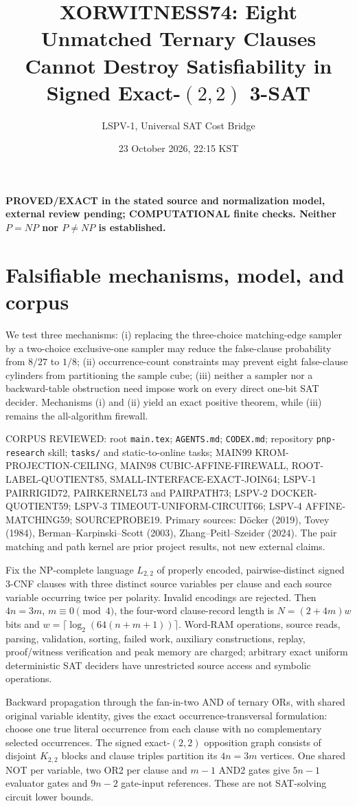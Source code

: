 \documentclass[11pt]{article}
\title{XORWITNESS74: Eight Unmatched Ternary Clauses Cannot Destroy Satisfiability in Signed Exact-$(2,2)$ 3-SAT}
\author{LSPV-1, Universal SAT Cost Bridge}
\date{23 October 2026, 22:15 KST}
\begin{document}
\maketitle
\begin{center}\textbf{PROVED/EXACT in the stated source and normalization model, external review pending; COMPUTATIONAL finite checks. Neither $P=NP$ nor $P\ne NP$ is established.}\end{center}
\section{Falsifiable mechanisms, model, and corpus}
We test three mechanisms: (i) replacing the three-choice matching-edge sampler by a two-choice exclusive-one sampler may reduce the false-clause probability from $8/27$ to $1/8$; (ii) occurrence-count constraints may prevent eight false-clause cylinders from partitioning the sample cube; (iii) neither a sampler nor a backward-table obstruction need impose work on every direct one-bit SAT decider. Mechanisms (i) and (ii) yield an exact positive theorem, while (iii) remains the all-algorithm firewall.

CORPUS REVIEWED: root \texttt{main.tex}; \texttt{AGENTS.md}; \texttt{CODEX.md}; repository \texttt{pnp-research} skill; \texttt{tasks/} and static-to-online tasks; MAIN99 KROM-PROJECTION-CEILING, MAIN98 CUBIC-AFFINE-FIREWALL, ROOT-LABEL-QUOTIENT85, SMALL-INTERFACE-EXACT-JOIN64; LSPV-1 PAIRRIGID72, PAIRKERNEL73 and PAIRPATH73; LSPV-2 DOCKER-QUOTIENT59; LSPV-3 TIMEOUT-UNIFORM-CIRCUIT66; LSPV-4 AFFINE-MATCHING59; SOURCEPROBE19. Primary sources: D\"ocker (2019), Tovey (1984), Berman--Karpinski--Scott (2003), Zhang--Peitl--Szeider (2024). The pair matching and path kernel are prior project results, not new external claims.

Fix the NP-complete language $L_{2,2}$ of properly encoded, pairwise-distinct signed 3-CNF clauses with three distinct source variables per clause and each source variable occurring twice per polarity. Invalid encodings are rejected. Then $4n=3m$, $m\equiv0\pmod4$, the four-word clause-record length is $N=(2+4m)w$ bits and $w=\lceil\log_2(64(n+m+1))\rceil$. Word-RAM operations, source reads, parsing, validation, sorting, failed work, auxiliary constructions, replay, proof/witness verification and peak memory are charged; arbitrary exact uniform deterministic SAT deciders have unrestricted source access and symbolic operations.

Backward propagation through the fan-in-two AND of ternary ORs, with shared original variable identity, gives the exact occurrence-transversal formulation: choose one true literal occurrence from each clause with no complementary selected occurrences. The signed exact-$(2,2)$ opposition graph consists of disjoint $K_{2,2}$ blocks and clause triples partition its $4n=3m$ vertices. One shared NOT per variable, two OR2 per clause and $m-1$ AND2 gates give $5n-1$ evaluator gates and $9n-2$ gate-input references. These are not SAT-solving circuit lower bounds.
\end{document}
